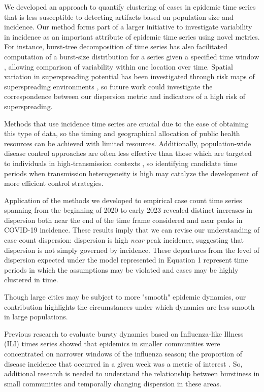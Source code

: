 \documentclass[10pt,letterpaper]{article}
\begin{document}
We developed an approach to quantify clustering of cases in epidemic time series that is less susceptible to detecting artifacts based on population size and incidence. 
Our method forms part of a larger initiative to investigate variability in incidence as an important attribute of epidemic time series using novel metrics.
For instance, burst-tree decomposition of time series has also facilitated computation of a burst-size distribution for a series given a specified time window \cite{jo_burst-tree_2020}, allowing comparison of variability within one location over time. 
Spatial variation in superspreading potential has been investigated through risk maps of superspreading environments \cite{loo_identification_2021}, so future work could investigate the correspondence between our dispersion metric and indicators of a high risk of superspreading.

Methods that use incidence time series are crucial due to the ease of obtaining this type of data, so the timing and geographical allocation of public health resources can be achieved with limited resources. 
Additionally, population-wide disease control approaches are often less effective than those which are targeted to individuals in high-transmission contexts \cite{lloyd-smith_superspreading_2005}, so identifying candidate time periods when transmission heterogeneity is high may catalyze the development of more efficient control strategies.

Application of the methods we developed to empirical case count time series spanning from the beginning of 2020 to early 2023 revealed distinct increases in dispersion both near the end of the time frame considered and near peaks in COVID-19 incidence.
These results imply that we can revise our understanding of case count dispersion: dispersion is high \emph{near} peak incidence, suggesting that dispersion is not simply governed by incidence. These departures from the level of dispersion expected under the model represented in Equation 1 represent time periods in which the assumptions may be violated and cases may be highly clustered in time.

Though large cities may be subject to more "smooth" epidemic dynamics, our contribution highlights the circumstances under which dynamics are less smooth in large populations.

Previous research to evaluate bursty dynamics based on Influenza-like Illness (ILI) times series showed that epidemics in smaller communities were concentrated on narrower windows of the influenza season; the proportion of disease incidence that occurred in a given week was a metric of interest \cite{dalziel_urbanization_2018}. 
So, additional research is needed to understand the relationship between burstiness in small communities and temporally changing dispersion in these areas.
\end{document}
